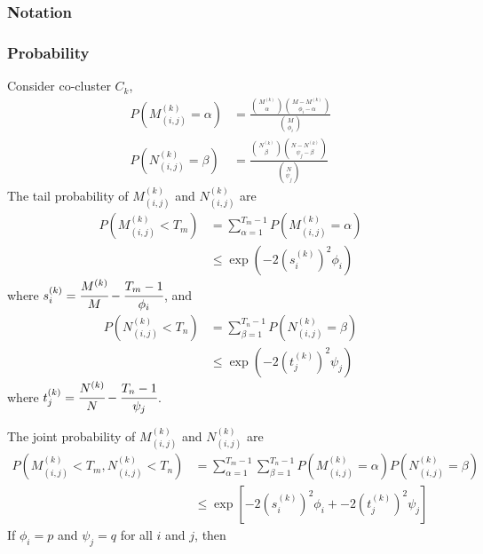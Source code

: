 \subsubsection{Notation}


\subsubsection{Probability}
Consider co-cluster $C_k$,
\begin{align*}
    P(M_{(i,j)}^{(k)} = \alpha) & = \frac{\binom{M^{(k)}}{\alpha} \binom{M-M^{(k)}}{\phi_i-\alpha}}{\binom{M}{\phi_i}} \\
    P(N_{(i,j)}^{(k)} = \beta)  & = \frac{\binom{N^{(k)}}{\beta} \binom{N-N^{(k)}}{\psi_j-\beta}}{\binom{N}{\psi_j}}
\end{align*}
The tail probability of $M_{(i,j)}^{(k)}$ and $N_{(i,j)}^{(k)}$ are
\begin{align*}
    P(M_{(i,j)}^{(k)} < T_m) & = \sum_{\alpha=1}^{T_m-1} P(M_{(i,j)}^{(k)} = \alpha) \\
                             & \le \exp(-2 (s_i^{(k)})^2 \phi_i)
\end{align*}
where $s_i^{(k)} = \cfrac{M^{(k)}}{M}-\cfrac{T_m-1}{\phi_i}$, and
\begin{align*}
    P(N_{(i,j)}^{(k)} < T_n) & = \sum_{\beta=1}^{T_n-1} P(N_{(i,j)}^{(k)} = \beta) \\
                             & \le \exp (-2 (t_j^{(k)})^2 \psi_j)
\end{align*}
where $t_j^{(k)} = \cfrac{N^{(k)}}{N}-\cfrac{T_n-1}{\psi_j}$.

The joint probability of $M_{(i,j)}^{(k)}$ and $N_{(i,j)}^{(k)}$ are
\begin{align*}
    P(M_{(i,j)}^{(k)} < T_m, N_{(i,j)}^{(k)} < T_n) & = \sum_{\alpha=1}^{T_m-1} \sum_{\beta=1}^{T_n-1} P(M_{(i,j)}^{(k)} = \alpha) P(N_{(i,j)}^{(k)} = \beta) \\
                                                    & \le \exp[-2 (s_i^{(k)})^2 \phi_i + -2 (t_j^{(k)})^2 \psi_j]
\end{align*}
If $\phi_i = p$ and $\psi_j = q$ for all $i$ and $j$, then

